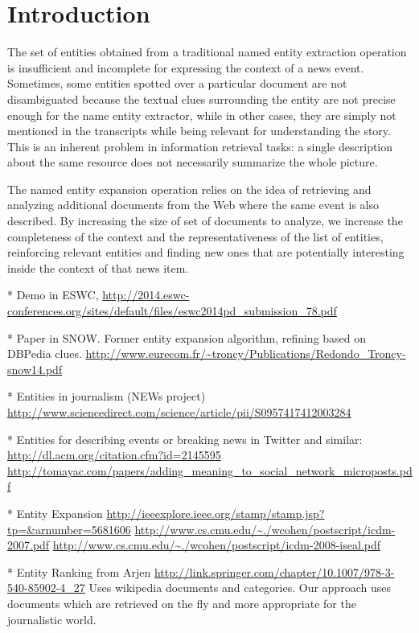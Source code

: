 \documentclass{llncs}
\begin{document}
\section{Introduction}
\label{sec:introduction}
The set of entities obtained from a traditional named entity extraction operation is insufficient and incomplete for expressing the context of a news event. Sometimes, some entities spotted over a particular document are not disambiguated because the textual clues surrounding the entity are not precise enough for the name entity extractor, while in other cases, they are simply not mentioned in the transcripts while being relevant for understanding the story. This is an inherent problem in information retrieval tasks: a single description about the same resource does not necessarily summarize the whole picture.

The named entity expansion operation relies on the idea of retrieving and analyzing additional documents from the Web where the same event is also described. By increasing the size of set of documents to analyze, we increase the completeness of the context and the representativeness of the list of entities, reinforcing relevant entities and finding new ones that are potentially interesting inside the context of that news item.

* Demo in ESWC,
\url{http://2014.eswc-conferences.org/sites/default/files/eswc2014pd_submission_78.pdf}

* Paper in SNOW. Former entity expansion algorithm, refining based on DBPedia clues.
\url{http://www.eurecom.fr/~troncy/Publications/Redondo_Troncy-snow14.pdf}

* Entities in journalism (NEWs project)
\url{http://www.sciencedirect.com/science/article/pii/S0957417412003284}

* Entities for describing events or breaking news in Twitter and similar:
\url{http://dl.acm.org/citation.cfm?id=2145595}
\url{http://tomayac.com/papers/adding_meaning_to_social_network_microposts.pdf}

* Entity Expansion
\url{http://ieeexplore.ieee.org/stamp/stamp.jsp?tp=&arnumber=5681606}
\url{http://www.cs.cmu.edu/~./wcohen/postscript/icdm-2007.pdf}
\url{http://www.cs.cmu.edu/~./wcohen/postscript/icdm-2008-iseal.pdf}

* Entity Ranking from Arjen
\url{http://link.springer.com/chapter/10.1007/978-3-540-85902-4_27}
Uses wikipedia documents and categories. Our approach uses documents which are retrieved on the fly and more appropriate for the journalistic world.
\end{document}
